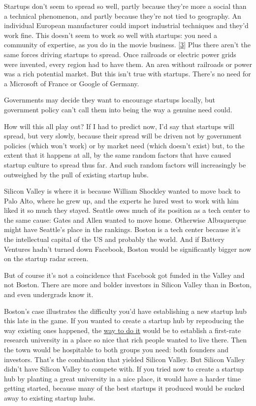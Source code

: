 Startups don't seem to spread so well, partly because they're more a social than a technical phenomenon, and partly because they're not tied to geography.  An individual European manufacturer could import industrial techniques and they'd work fine.  This doesn't seem to work so well with startups: you need a community of expertise, as you do in the movie business.  [\href{\#f3n}{3}]
 Plus there aren't the same forces driving startups to spread.  Once railroads or electric power grids were invented, every region had to have them.  An area without railroads or power was a rich potential market.  But this isn't true with startups.  There's no need for a Microsoft of France or Google of Germany.

Governments may decide they want to encourage startups locally, but government policy can't call them into being the way a genuine need could.

How will this all play out?  If I had to predict now, I'd say that startups will spread, but very slowly, because their spread will be driven not by government policies (which won't work) or by market need (which doesn't exist) but, to the extent that it happens at all, by the same random factors that have caused startup culture to spread thus far.  And such random factors will increasingly be outweighed by the pull of existing startup hubs.

Silicon Valley is where it is because William Shockley wanted to move back to Palo Alto, where he grew up, and the experts he lured west to work with him liked it so much they stayed.  Seattle owes much of its position as a tech center to the same cause: Gates and Allen wanted to move home.  Otherwise Albuquerque might have Seattle's place in the rankings.  Boston is a tech center because it's the intellectual capital of the US and probably the world.  And if Battery Ventures hadn't turned down Facebook, Boston would be significantly bigger now on the startup radar screen.

But of course it's not a coincidence that Facebook got funded in the Valley and not Boston.  There are more and bolder investors in Silicon Valley than in Boston, and even undergrads know it.

Boston's case illustrates the difficulty you'd have establishing a new startup hub this late in the game.  If you wanted to create a startup hub by reproducing the way existing ones happened, the 
\href{http://www.paulgraham.com/siliconvalley.html}{way to do it} would be to establish a first-rate research university in a place so nice that rich people wanted to live there.  Then the town would be hospitable to both groups you need: both founders and investors.  That's the combination that yielded Silicon Valley.  But Silicon Valley didn't have Silicon Valley to compete with.  If you tried now to create a startup hub by planting a great university in a nice place, it would have a harder time getting started, because many of the best startups it produced would be sucked away to existing startup hubs.

